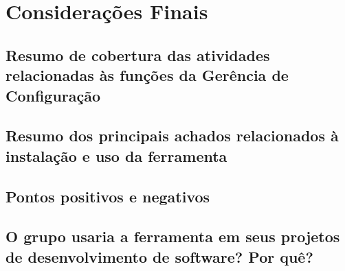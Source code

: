 \chapter[Considerações Finais]{Considerações Finais}

\section{Resumo de cobertura das atividades relacionadas às funções da Gerência de Configuração}
\section{Resumo dos principais achados relacionados à instalação e uso da ferramenta}
\section{Pontos positivos e negativos}
\section{O grupo usaria a ferramenta em seus projetos de desenvolvimento de software? Por quê?}
